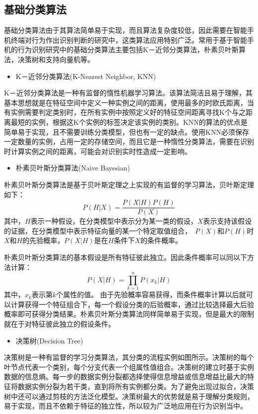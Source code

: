\subsection{基础分类算法}
\par 基础分类算法由于其算法简单易于实现，而且算法复杂度较低，因此需要在智能手机终端对行为作出识别判断的研究中，这类算法应用特别广泛。常用于基于智能手机的行为识别研究中的基础分类算法主要包括K－近邻分类算法，朴素贝叶斯算法，决策树和支持向量机等。

\begin{itemize}
	\item K－近邻分类算法(K-Nearest Neighbor, KNN)
\end{itemize}
\par K－近邻分类算法是一种有监督的惰性机器学习算法。该算法简洁且易于理解，其基本思想就是在特征空间中定义一种实例之间的距离，使用最多的时欧氏距离，当有实例需要判定类别时，在所有实例中按照定义好的特征空间距离寻找K个与之距离最短的实例，根据这K个实例的标签决定该实例的类别。KNN的算法的优点是简单易于实现，且不需要训练分类模型，但也有一定的缺点。使用KNN必须保存一定数量的实例，占用一定的存储空间，而且它是一种惰性分类算法，需要在识别时计算实例之间的距离，可能会对识别实时性造成一定影响。
\begin{itemize}
	\item 朴素贝叶斯分类算法(Naive Bayesian)
\end{itemize}
\par 朴素贝叶斯分类算法是基于贝叶斯定理之上实现的有监督的学习算法，贝叶斯定理如下：
\begin{equation}
	P(H|X) = \frac{P(X|H)P(H)}{P(X)}
\end{equation}
其中，$H$表示一种假设，在分类模型中表示分为某一类的假设，$X$表示支持该假设的证据，在分类模型中表示特征向量的某一个特定取值组合，　$P(X)$和$P(H)$时$X$和$H$的先验概率，$P(X|H)$是在$H$条件下$X$的条件概率。
\par 朴素贝叶斯分类算法的基本假设是所有特征彼此独立。因此条件概率可以同以下方法计算：
\begin{equation}
	P(X|H) = \prod_{k=1}^{n}P(x_k|H)
\end{equation}
其中，$x_k$表示第$k$个属性的值。
由于先验概率容易获得，而条件概率计算以后就可以计算获得一个特征组合下，每一个假设分类的后验概率，通过比较选择最大后验概率即可获得分类结果。朴素贝叶斯分类算法同样简单易于实现，但是最大的限制就在于对特征彼此独立的假设条件。

\begin{itemize}
	\item 决策树(Decision Tree)
\end{itemize}
\par 决策树是一种有监督的学习分类算法，其分类的流程实例如图所示。决策树的每个叶节点代表一个类别，每个分支代表一个组属性值组合。决策树的建立时基于实例数据的信息熵。每一步的数据实例分裂都选择使得信息增益或信息增益比最大的特征将数据实例分裂为若干类，直到将所有实例都分类。为了避免出现过拟合，决策树中还可以通过剪枝的方法泛化模型。决策树最大的优势就是易于理解分类规则，易于实现，而且不依赖于特征的独立性，所以较为广泛地应用在行为识别当中。

